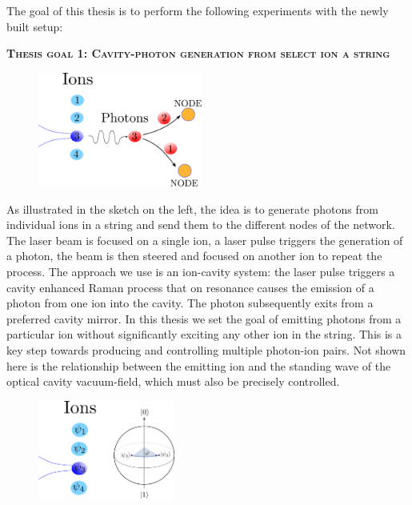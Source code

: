 \documentclass[english, a4paper, 12pt, twoside]{book}
\numberwithin{equation}{section} %
\begin{document}
The goal of this thesis is to perform the following experiments with the newly built setup:\par\noindent%
{\large\textbf{\textsc{Thesis goal 1: Cavity-photon generation from select ion a string}}}\\
\begin{figure}
  \centering
    \includegraphics[width=0.48\textwidth]{photongeneration3}
\end{figure}
As illustrated in the sketch on the left, the idea is to generate photons from individual ions in a string and send them to the different nodes of the network. The laser beam is focused on a single ion, a laser pulse triggers the generation of a photon, the beam is then steered and focused on another ion to repeat the process. The approach we use is an ion-cavity system: the laser pulse triggers a cavity enhanced Raman process \cite{stuteinterface} that on resonance causes the emission of a photon from one ion into the cavity. The photon subsequently exits from a preferred cavity mirror. In this thesis we set the goal of emitting photons from a particular ion without significantly exciting any other ion in the string. This is a key step towards producing and controlling multiple photon-ion pairs. Not shown here is the relationship between the emitting ion and the standing wave of the optical cavity vacuum-field, which must also be precisely controlled.\newpage
{}\\
\begin{figure}
\centering
    \includegraphics[width=0.4\textwidth]{qubitmanipulation}
\end{figure}
\end{document}
